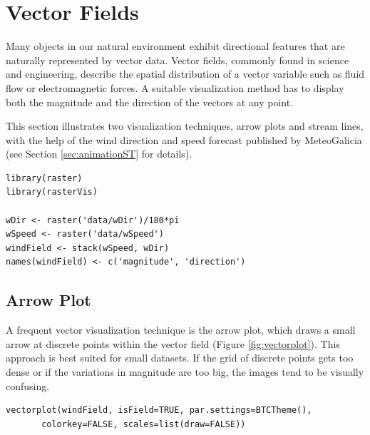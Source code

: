 
\section{Vector Fields}
\label{sec-1}
\label{sec:vector}

Many objects in our natural environment exhibit directional
features that are naturally represented by vector data. Vector
fields, commonly found in science and engineering, describe the
spatial distribution of a vector variable such as fluid flow or
electromagnetic forces. A suitable visualization method has to
display both the magnitude and the direction of the vectors at any
point.

This section illustrates two visualization techniques, arrow plots and
stream lines, with the help of the wind direction and speed forecast
published by MeteoGalicia (see Section \ref{sec:animationST} for
details).


\lstset{language=R,numbers=none}
\begin{lstlisting}
library(raster)
library(rasterVis)

wDir <- raster('data/wDir')/180*pi
wSpeed <- raster('data/wSpeed')
windField <- stack(wSpeed, wDir)
names(windField) <- c('magnitude', 'direction')
\end{lstlisting}

\subsection{Arrow Plot}
\label{sec-1-1}
A frequent vector visualization technique is the arrow plot, which
draws a small arrow at discrete points within the vector field
(Figure \ref{fig:vectorplot}). This approach is best suited for
small datasets. If the grid of discrete points gets too dense or
if the variations in magnitude are too big, the images tend to be
visually confusing.

\lstset{language=R,numbers=none}
\begin{lstlisting}
vectorplot(windField, isField=TRUE, par.settings=BTCTheme(),
	   colorkey=FALSE, scales=list(draw=FALSE))
\end{lstlisting}

